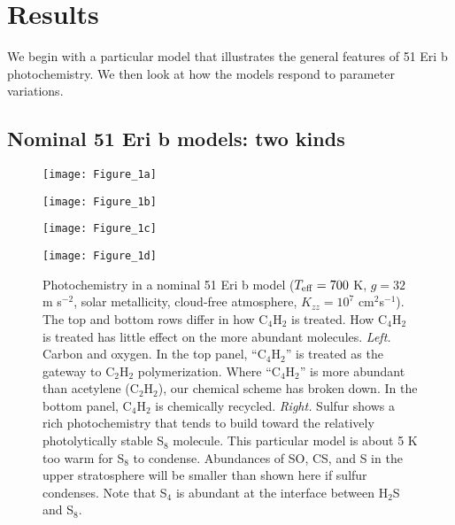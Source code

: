 \documentclass[preprint]{aastex6}
\begin{document}
\section{Results}
\label{Results}

We begin with a particular model that illustrates the general features of 51 Eri b photochemistry.
We then look at how the models respond to parameter variations. 

\subsection{Nominal 51 Eri b models: two kinds}

\begin{figure}[!htb]
 \centering
 \begin{minipage}[c]{0.49\textwidth}
   \centering
  \texttt{[image: Figure\_1a]} 
 \end{minipage}
 \begin{minipage}[c]{0.49\textwidth}
   \centering
 \texttt{[image: Figure\_1b]} 
 \end{minipage}
 \centering
 \begin{minipage}[c]{0.49\textwidth}
   \centering
 \texttt{[image: Figure\_1c]} 
 \end{minipage}
 \begin{minipage}[c]{0.49\textwidth}
   \centering
 \texttt{[image: Figure\_1d]} 
 \end{minipage}
 \caption{\small Photochemistry in a nominal 51 Eri b model
  ($T_{\rm eff}=700$ K, $g=32$ m s$^{-2}$, solar metallicity, cloud-free atmosphere, $K_{zz}=10^7$ cm$^2$s$^{-1}$).
  The top and bottom rows differ in how C$_4$H$_2$ is treated. 
  How C$_4$H$_2$ is treated has little effect on the more abundant molecules. %
   {\it Left.} Carbon and oxygen.  In the top panel, ``C$_4$H$_2$'' is treated as the gateway to C$_2$H$_2$ polymerization.
     Where ``C$_4$H$_2$'' is more abundant than acetylene (C$_2$H$_2$), our chemical scheme has broken down.
  In the bottom panel, C$_4$H$_2$ is chemically recycled.     
  {\it Right.} Sulfur shows a rich photochemistry that tends to build toward the relatively photolytically stable S$_8$ molecule.
  This particular model is about 5 K too warm for S$_8$ to condense. 
   Abundances of SO, CS, and S in the upper stratosphere will be smaller
  than shown here if sulfur condenses.
  Note that S$_4$ is abundant at the interface between H$_2$S and S$_8$.  
  }
\label{T700K7}
\end{figure}
\end{document}
